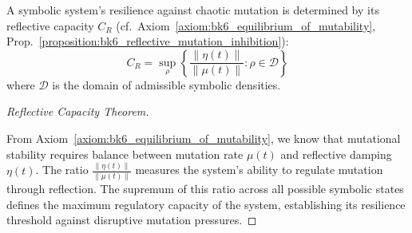 \begin{corollary}
\label{corollary:bk6_reflective_capacity_theorem}
A symbolic system's resilience against chaotic mutation is determined by its reflective capacity $C_R$ (cf.~Axiom~\ref{axiom:bk6_equilibrium_of_mutability}, Prop.~\ref{proposition:bk6_reflective_mutation_inhibition}):
\begin{equation}
C_R = \sup_{\rho} \left\{\frac{\|\eta(t)\|}{\|\mu(t)\|} : \rho \in \mathcal{D}\right\}
\end{equation}
where $\mathcal{D}$ is the domain of admissible symbolic densities.
\begin{proof}[Reflective Capacity Theorem]
\label{proof:bk6_reflective_capacity_theorem}
\leavevmode

From Axiom~\ref{axiom:bk6_equilibrium_of_mutability}, we know that mutational stability requires balance between mutation rate $\mu(t)$ and reflective damping $\eta(t)$. The ratio $\frac{\|\eta(t)\|}{\|\mu(t)\|}$ measures the system's ability to regulate mutation through reflection. The supremum of this ratio across all possible symbolic states defines the maximum regulatory capacity of the system, establishing its resilience threshold against disruptive mutation pressures.
\end{proof}
\end{corollary}
